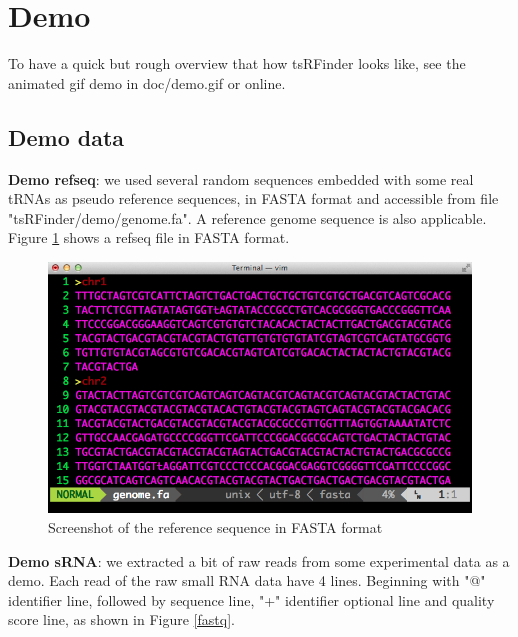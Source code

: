 \documentclass[11pt, a4paper]{article}
\begin{document}
\section{Demo}

To have a quick but rough overview that how tsRFinder looks like, see the animated gif demo in doc/demo.gif or online.

\subsection{Demo data}

\textbf{Demo refseq}: we used several random sequences embedded with some real tRNAs as pseudo reference sequences, in FASTA format and accessible from file "tsRFinder/demo/genome.fa". A reference genome sequence is also applicable. Figure \ref{refseq} shows a refseq file in FASTA format.

\begin{figure}[htbp]
\begin{center}
\includegraphics[width=12cm]{refseq.png}
\caption{Screenshot of the reference sequence in FASTA format} 
\label{refseq}
\end{center}
\end{figure}

\textbf{Demo sRNA}: we extracted a bit of raw reads from some experimental data as a demo. Each read of the raw small RNA data have 4 lines. Beginning with "@" identifier line, followed by sequence line, "+" identifier optional line and quality score line, as shown in Figure \ref{fastq}.
\end{document}
